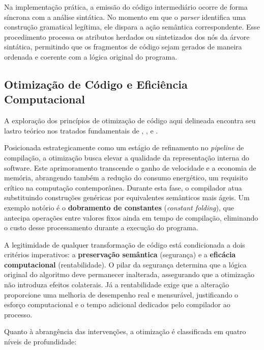 Na implementação prática, a emissão do código intermediário ocorre de forma síncrona com a análise sintática. No momento em que o \textit{parser} identifica uma construção gramatical legítima, ele dispara a ação semântica correspondente. Esse procedimento processa os atributos herdados ou sintetizados dos nós da árvore sintática, permitindo que os fragmentos de código sejam gerados de maneira ordenada e coerente com a lógica original do programa.

\subsection{Otimização de Código e Eficiência Computacional}

A exploração dos princípios de otimização de código aqui delineada encontra seu lastro teórico nos tratados fundamentais de , ,  e .

Posicionada estrategicamente como um estágio de refinamento no \textit{pipeline} de compilação, a otimização busca elevar a qualidade da representação interna do software. Este aprimoramento transcende o ganho de velocidade e a economia de memória, abrangendo também a redução do consumo energético, um requisito crítico na computação contemporânea. Durante esta fase, o compilador atua substituindo construções genéricas por equivalentes semânticos mais ágeis. Um exemplo notório é o \textbf{dobramento de constantes} (\textit{constant folding}), que antecipa operações entre valores fixos ainda em tempo de compilação, eliminando o custo desse processamento durante a execução do programa.



A legitimidade de qualquer transformação de código está condicionada a dois critérios imperativos: a \textbf{preservação semântica} (segurança) e a \textbf{eficácia computacional} (rentabilidade). O pilar da segurança determina que a lógica original do algoritmo deve permanecer inalterada, assegurando que a otimização não introduza efeitos colaterais. Já a rentabilidade exige que a alteração proporcione uma melhoria de desempenho real e mensurável, justificando o esforço computacional e o tempo adicional dedicados pelo compilador ao processo.

Quanto à abrangência das intervenções, a otimização é classificada em quatro níveis de profundidade:



